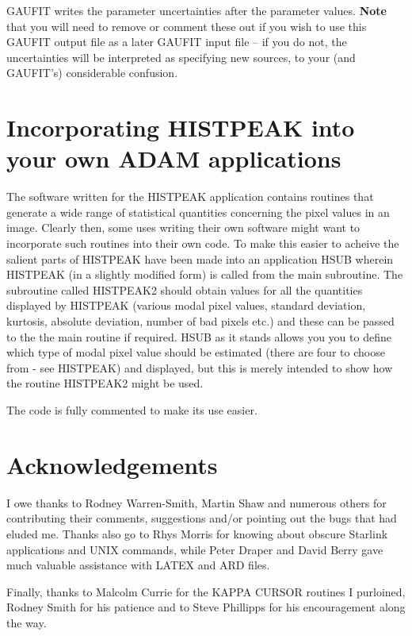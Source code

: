 \documentclass[twoside,11pt]{article}
\newcommand{\xref}[3]{#1}
\begin{document}
GAUFIT writes the parameter uncertainties after the parameter values.
\textbf{Note} that you will need to remove or comment these out if you
wish to use this GAUFIT output file as a later GAUFIT input file -- if
you do not, the uncertainties will be interpreted as specifying new
sources, to your (and GAUFIT's) considerable confusion.
  

\section{Incorporating HISTPEAK into your own ADAM applications}
\label{sec:incorporating}

The software written for the HISTPEAK application contains routines that generate 
a wide range of statistical quantities concerning the pixel values in
an image. Clearly then, some uses writing their own software might want to 
incorporate such routines into their own code. To make this easier to acheive 
the salient parts of HISTPEAK have been made into an application HSUB wherein
HISTPEAK (in a slightly modified form) is called from the main subroutine.
The subroutine called HISTPEAK2 should obtain values for all the 
quantities displayed by HISTPEAK (various modal pixel values, standard 
deviation, kurtosis, absolute deviation, number of bad pixels etc.) and these 
can be passed to the the main routine if required. HSUB as it stands allows you 
you to define which type of modal pixel value should be estimated
(there are four to choose from - see HISTPEAK) and displayed, but this
is merely intended to show how the routine HISTPEAK2 might be used.

The code is fully commented to make its use easier. 


\section{Acknowledgements}
\label{sec:acknowledgements}

I owe thanks to Rodney Warren-Smith, Martin Shaw and numerous others for
contributing their comments, suggestions and/or pointing out the bugs that had
eluded me. Thanks also go to Rhys Morris for knowing about obscure Starlink 
applications and UNIX commands, while Peter Draper  and David Berry gave 
much valuable assistance with LATEX and ARD files.

Finally, thanks to Malcolm Currie for the \xref{KAPPA}{sun95}{} CURSOR routines I purloined, 
Rodney Smith for his patience and to Steve Phillipps for his encouragement 
along the way.
\end{document}
